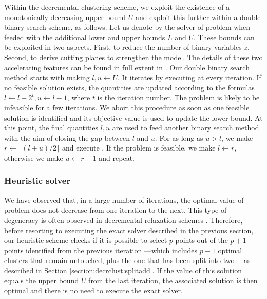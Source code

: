 \documentclass[ijoo,nonblindrev]{informs-ijoo}
\begin{document}
Within the decremental clustering scheme, we exploit the existence of a monotonically decreasing upper bound $U$ and exploit this further within a double binary search scheme, as follows. Let us denote by  the solver of problem  when feeded with the additional lower and upper bounds $L$ and $U$. These bounds can be exploited in two aspects. First, to reduce the number of binary variables $z$. Second, to derive cutting planes to strengthen the model. The details of these two accelerating features can be found in full extent in \citet{Sayah2017new}. Our double binary search method starts with making $l, u \leftarrow U$. It iterates by executing  at every iteration. If no feasible solution exists, the quantities are updated according to the formulas $l\leftarrow l - 2^t, u \leftarrow l - 1$, where $t$ is the iteration number. The problem  is likely to be infeasible for a few iterations. We abort this procedure as soon as one feasible solution is identified and its objective value is used to update the lower bound. At this point, the final quantities $l, u$ are used to feed another binary search method with the aim of closing the gap between $l$ and $u$. For as long as $u > l$, we make $r\leftarrow \lceil (l + u) / 2\rceil$ and execute . If the problem is feasible, we make $l\leftarrow r$, otherwise we make $u\leftarrow r - 1$ and repeat.

\subsubsection{Heuristic solver}

We have observed that, in a large number of iterations, the optimal value of problem  does not decrease from one iteration to the next. This type of degeneracy is often observed in decremental relaxation schemes \citep{Aloise2018sampling, Contardo2019scalable}. Therefore, before resorting to executing the exact solver described in the previous section, our heuristic scheme checks if it is possible to select $p$ points out of the $p + 1$ points identified from the previous iteration ---which includes $p - 1$ optimal clusters that remain untouched, plus the one that has been split into two--- as described in Section \ref{section:decrclust:splitadd}. If the value of this solution equals the upper bound $U$ from the last iteration, the associated solution is then optimal and there is no need to execute the exact solver.
\end{document}
